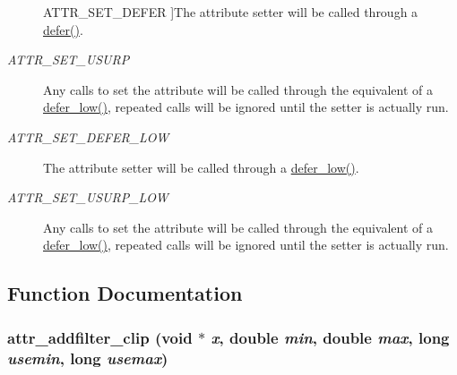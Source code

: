 \begin{Desc}
\begin{description}
{\hypertarget{group__attr_ggaf296cfc6741bb19207f6ed8062809115abbc30163a3d643a145299509fbac41ea}{
ATTR\_\-SET\_\-DEFER}
\label{group__attr_ggaf296cfc6741bb19207f6ed8062809115abbc30163a3d643a145299509fbac41ea}
}]The attribute setter will be called through a \hyperlink{group__threading_gaa24a0c9896f1ad241e45590065c3f643}{defer()}. \item[{\em 
\hypertarget{group__attr_ggaf296cfc6741bb19207f6ed8062809115afdd45e761f2f86cec9fb26db0e6c16ca}{
ATTR\_\-SET\_\-USURP}
\label{group__attr_ggaf296cfc6741bb19207f6ed8062809115afdd45e761f2f86cec9fb26db0e6c16ca}
}]Any calls to set the attribute will be called through the equivalent of a \hyperlink{group__threading_ga486daa40ddb16f70b663615695d18315}{defer\_\-low()}, repeated calls will be ignored until the setter is actually run. \item[{\em 
\hypertarget{group__attr_ggaf296cfc6741bb19207f6ed8062809115ab12301ae2bbf46599ccee979b0e53879}{
ATTR\_\-SET\_\-DEFER\_\-LOW}
\label{group__attr_ggaf296cfc6741bb19207f6ed8062809115ab12301ae2bbf46599ccee979b0e53879}
}]The attribute setter will be called through a \hyperlink{group__threading_ga486daa40ddb16f70b663615695d18315}{defer\_\-low()}. \item[{\em 
\hypertarget{group__attr_ggaf296cfc6741bb19207f6ed8062809115af5c738544e75ccc1da02e19e3387a9c8}{
ATTR\_\-SET\_\-USURP\_\-LOW}
\label{group__attr_ggaf296cfc6741bb19207f6ed8062809115af5c738544e75ccc1da02e19e3387a9c8}
}]Any calls to set the attribute will be called through the equivalent of a \hyperlink{group__threading_ga486daa40ddb16f70b663615695d18315}{defer\_\-low()}, repeated calls will be ignored until the setter is actually run. \end{description}
\end{Desc}



\subsection{Function Documentation}
\hypertarget{group__attr_ga0841b11d7ee52b4c03c44ed6be99d631}{
\subsubsection[{attr\_\-addfilter\_\-clip}]{ attr\_\-addfilter\_\-clip (void $\ast$ {\em x}, \/  double {\em min}, \/  double {\em max}, \/  long {\em usemin}, \/  long {\em usemax})}}
\label{group__attr_ga0841b11d7ee52b4c03c44ed6be99d631}


